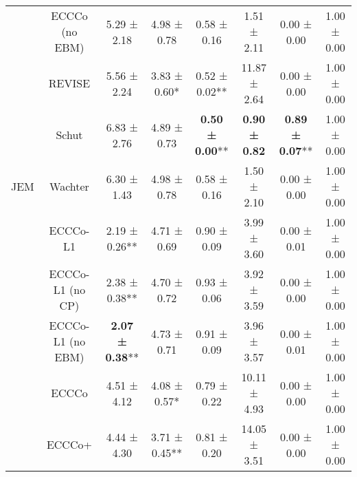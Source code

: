 \begin{table}
{\begin{tabular}[t]{cccccccc}
 & ECCCo (no EBM) & 5.29 ± 2.18\hphantom{*}\hphantom{*} & 4.98 ± 0.78\hphantom{*}\hphantom{*} & 0.58 ± 0.16\hphantom{*}\hphantom{*} & 1.51 ± 2.11\hphantom{*}\hphantom{*} & 0.00 ± 0.00\hphantom{*}\hphantom{*} & 1.00 ± 0.00\hphantom{*}\hphantom{*}\\

 & REVISE & 5.56 ± 2.24\hphantom{*}\hphantom{*} & 3.83 ± 0.60*\hphantom{*} & 0.52 ± 0.02** & 11.87 ± 2.64\hphantom{*}\hphantom{*} & 0.00 ± 0.00\hphantom{*}\hphantom{*} & 1.00 ± 0.00\hphantom{*}\hphantom{*}\\

 & Schut & 6.83 ± 2.76\hphantom{*}\hphantom{*} & 4.89 ± 0.73\hphantom{*}\hphantom{*} & \textbf{0.50 ± 0.00}** & \textbf{0.90 ± 0.82}\hphantom{*}\hphantom{*} & \textbf{0.89 ± 0.07}** & 1.00 ± 0.00\hphantom{*}\hphantom{*}\\

\multirow[t]{-10}{*}{\centering\arraybackslash JEM} & Wachter & 6.30 ± 1.43\hphantom{*}\hphantom{*} & 4.98 ± 0.78\hphantom{*}\hphantom{*} & 0.58 ± 0.16\hphantom{*}\hphantom{*} & 1.50 ± 2.10\hphantom{*}\hphantom{*} & 0.00 ± 0.00\hphantom{*}\hphantom{*} & 1.00 ± 0.00\hphantom{*}\hphantom{*}\\
\cmidrule{1-8}
 & ECCCo-L1 & 2.19 ± 0.26** & 4.71 ± 0.69\hphantom{*}\hphantom{*} & 0.90 ± 0.09\hphantom{*}\hphantom{*} & 3.99 ± 3.60\hphantom{*}\hphantom{*} & 0.00 ± 0.01\hphantom{*}\hphantom{*} & 1.00 ± 0.00\hphantom{*}\hphantom{*}\\

 & ECCCo-L1 (no CP) & 2.38 ± 0.38** & 4.70 ± 0.72\hphantom{*}\hphantom{*} & 0.93 ± 0.06\hphantom{*}\hphantom{*} & 3.92 ± 3.59\hphantom{*}\hphantom{*} & 0.00 ± 0.00\hphantom{*}\hphantom{*} & 1.00 ± 0.00\hphantom{*}\hphantom{*}\\

 & ECCCo-L1 (no EBM) & \textbf{2.07 ± 0.38}** & 4.73 ± 0.71\hphantom{*}\hphantom{*} & 0.91 ± 0.09\hphantom{*}\hphantom{*} & 3.96 ± 3.57\hphantom{*}\hphantom{*} & 0.00 ± 0.01\hphantom{*}\hphantom{*} & 1.00 ± 0.00\hphantom{*}\hphantom{*}\\

 & ECCCo & 4.51 ± 4.12\hphantom{*}\hphantom{*} & 4.08 ± 0.57*\hphantom{*} & 0.79 ± 0.22\hphantom{*}\hphantom{*} & 10.11 ± 4.93\hphantom{*}\hphantom{*} & 0.00 ± 0.00\hphantom{*}\hphantom{*} & 1.00 ± 0.00\hphantom{*}\hphantom{*}\\

 & ECCCo+ & 4.44 ± 4.30\hphantom{*}\hphantom{*} & 3.71 ± 0.45** & 0.81 ± 0.20\hphantom{*}\hphantom{*} & 14.05 ± 3.51\hphantom{*}\hphantom{*} & 0.00 ± 0.00\hphantom{*}\hphantom{*} & 1.00 ± 0.00\hphantom{*}\hphantom{*}\\


\end{tabular}}
\end{table}
